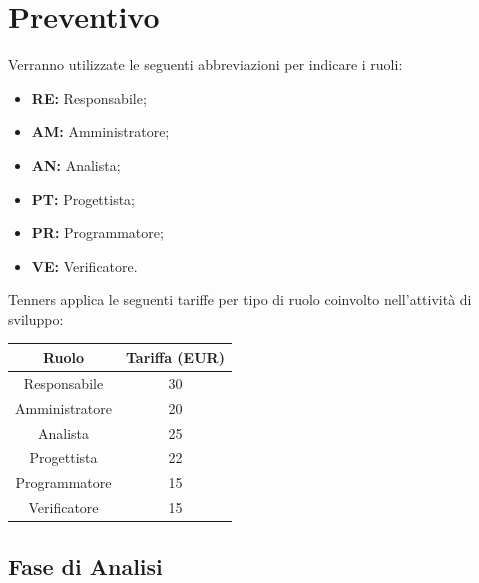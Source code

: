 \section{Preventivo}
Verranno utilizzate le seguenti abbreviazioni per indicare i ruoli:
\begin{itemize}
	\item \textbf{RE:} Responsabile;
	\item \textbf{AM:} Amministratore;
	\item \textbf{AN:} Analista;
	\item \textbf{PT:} Progettista;
	\item \textbf{PR:} Programmatore;
	\item \textbf{VE:} Verificatore.
\end{itemize}
Tenners applica le seguenti tariffe per tipo di ruolo coinvolto nell'attività di sviluppo:\\
\begin{center}
\begin{tabular}{ |c|c|  }
 \hline
 Ruolo 		& Tariffa (EUR)\\
 \hline\hline
	Responsabile	& 30\\
	Amministratore	& 20\\
	Analista		& 25\\
	Progettista		& 22\\
	Programmatore	& 15\\
	Verificatore	& 15\\
 \hline
\end{tabular}
\end{center}
\newpage
\subsection{Fase di Analisi}

